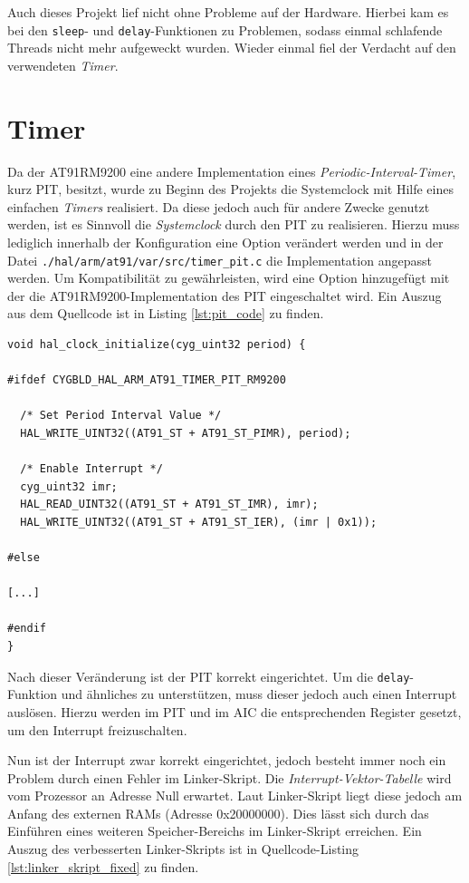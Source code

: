 \documentclass[
  a4paper,					%
  twoside,
  DIV=calc,     				%
  bibliography=totoc,
  cleardoublepage=empty,
  ngerman,     					%
  final       					%
]{scrbook}
\begin{document}
Auch dieses Projekt lief nicht ohne Probleme auf der Hardware. Hierbei kam es bei den \texttt{sleep}- und \texttt{delay}-Funktionen zu Problemen, sodass einmal schlafende Threads nicht mehr aufgeweckt wurden. Wieder einmal fiel der Verdacht auf den verwendeten \emph{Timer}. 




\section{Timer}
\label{sec:Timer}

Da der AT91RM9200 eine andere Implementation eines \emph{Periodic-Interval-Timer}, kurz PIT, besitzt, wurde zu Beginn des Projekts die Systemclock mit Hilfe eines einfachen \emph{Timers} realisiert. Da diese jedoch auch für andere Zwecke genutzt werden, ist es Sinnvoll die \emph{Systemclock} durch den PIT zu realisieren. Hierzu muss lediglich innerhalb der Konfiguration eine Option verändert werden und in der Datei \texttt{./hal/arm/at91/var/src/timer\_pit.c} die Implementation angepasst werden. Um Kompatibilität zu gewährleisten, wird eine Option hinzugefügt mit der die AT91RM9200-Implementation des PIT eingeschaltet wird. Ein Auszug aus dem Quellcode ist in Listing \ref{lst:pit_code} zu finden.

\begin{lstlisting}[frame=single, float, caption={PIT Implementation}, label={lst:pit_code}]
void hal_clock_initialize(cyg_uint32 period) {

#ifdef CYGBLD_HAL_ARM_AT91_TIMER_PIT_RM9200

  /* Set Period Interval Value */
  HAL_WRITE_UINT32((AT91_ST + AT91_ST_PIMR), period);

  /* Enable Interrupt */
  cyg_uint32 imr;
  HAL_READ_UINT32((AT91_ST + AT91_ST_IMR), imr);
  HAL_WRITE_UINT32((AT91_ST + AT91_ST_IER), (imr | 0x1));

#else

[...]

#endif
}
\end{lstlisting}

Nach dieser Veränderung ist der PIT korrekt eingerichtet. Um die \texttt{delay}-Funktion und ähnliches zu unterstützen, muss dieser jedoch auch einen Interrupt auslösen. Hierzu werden im PIT und im AIC die entsprechenden Register gesetzt, um den Interrupt freizuschalten. 

Nun ist der Interrupt zwar korrekt eingerichtet, jedoch besteht immer noch ein Problem durch einen Fehler im Linker-Skript. Die \emph{Interrupt-Vektor-Tabelle} wird vom Prozessor an Adresse Null erwartet. Laut Linker-Skript liegt diese jedoch am Anfang des externen RAMs (Adresse 0x20000000). Dies lässt sich durch das Einführen eines weiteren Speicher-Bereichs im Linker-Skript erreichen. Ein Auszug des verbesserten Linker-Skripts ist in Quellcode-Listing \ref{lst:linker_skript_fixed} zu finden.
\end{document}

